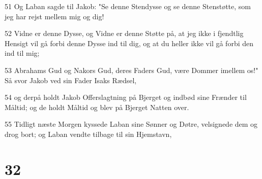 \par 51 Og Laban sagde til Jakob: "Se denne Stendysse og se denne Stenstøtte, som jeg har rejst mellem mig og dig!
\par 52 Vidne er denne Dysse, og Vidne er denne Støtte på, at jeg ikke i fjendtlig Hensigt vil gå forbi denne Dysse ind til dig, og at du heller ikke vil gå forbi den ind til mig;
\par 53 Abrahams Gud og Nakors Gud, deres Faders Gud, være Dommer imellem os!" Så svor Jakob ved sin Fader Isaks Rædsel,
\par 54 og derpå holdt Jakob Offerslagtning på Bjerget og indbød sine Frænder til Måltid; og de holdt Måltid og blev på Bjerget Natten over.
\par 55 Tidligt næste Morgen kyssede Laban sine Sønner og Døtre, velsignede dem og drog bort; og Laban vendte tilbage til sin Hjemstavn,

\chapter{32}

